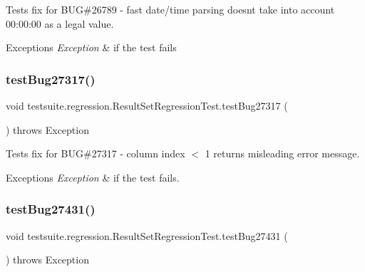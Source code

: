 Tests fix for B\+UG\#26789 -\/ fast date/time parsing doesn\textquotesingle{}t take into account 00\+:00\+:00 as a legal value.


\begin{DoxyExceptions}{Exceptions}
{\em Exception} & if the test fails \\
\hline
\end{DoxyExceptions}
\mbox{\label{classtestsuite_1_1regression_1_1_result_set_regression_test_af045c2d205dada239fec239d477c2563}} 
\subsubsection{\texorpdfstring{test\+Bug27317()}{testBug27317()}}
{\footnotesize\ttfamily void testsuite.\+regression.\+Result\+Set\+Regression\+Test.\+test\+Bug27317 (\begin{DoxyParamCaption}{ }\end{DoxyParamCaption}) throws Exception}

Tests fix for B\+UG\#27317 -\/ column index $<$ 1 returns misleading error message.


\begin{DoxyExceptions}{Exceptions}
{\em Exception} & if the test fails. \\
\hline
\end{DoxyExceptions}
\mbox{\label{classtestsuite_1_1regression_1_1_result_set_regression_test_a15f6161acd08c5aa030af74045acd6c8}} 
\subsubsection{\texorpdfstring{test\+Bug27431()}{testBug27431()}}
{\footnotesize\ttfamily void testsuite.\+regression.\+Result\+Set\+Regression\+Test.\+test\+Bug27431 (\begin{DoxyParamCaption}{ }\end{DoxyParamCaption}) throws Exception}

